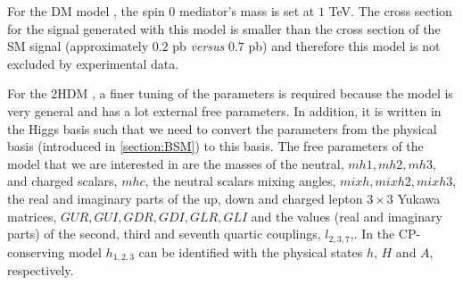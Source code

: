 
For the DM model \cite{DM}, the spin 0 mediator's mass is set at $1$ TeV. The cross section for the signal generated with this model is smaller than the cross section of the SM signal (approximately $0.2$ pb \textit{versus} $0.7$ pb) and therefore this model is not excluded by experimental data.

For the 2HDM \cite{2HDM,2HDM1}, a finer tuning of the parameters is required because the model is very general and has a lot external free parameters. In addition, it is written in the Higgs basis such that we need to convert the parameters from the physical basis (introduced in \ref{section:BSM}) to this basis. The free parameters of the model that we are interested in are the masses of the neutral, $mh1, mh2, mh3$, and charged scalars, $mhc$, the neutral scalars mixing angles, $mixh, mixh2, mixh3$, the real and imaginary parts of the up, down and charged lepton $3\times 3$ Yukawa matrices, $GUR, GUI, GDR, GDI, GLR, GLI$ and the values (real and imaginary parts) of the second, third and seventh quartic couplings, $l_{2,3,7}$,. In the CP-conserving model $h_{1,2,3}$ can be identified with the physical states $h$, $H$ and $A$, respectively.

